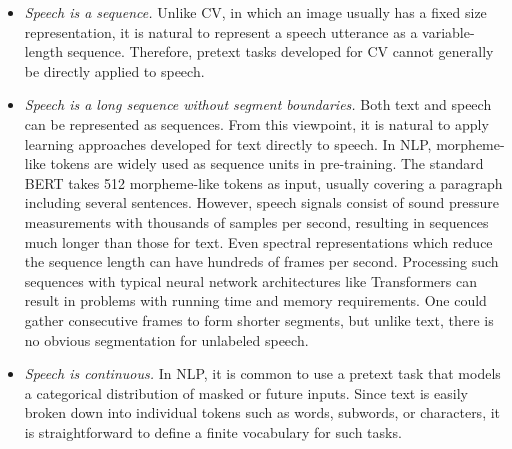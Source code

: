 \begin{itemize}
\item \textit{Speech is a sequence.} 
Unlike CV, in which an image usually has a fixed size representation, it is
natural to represent a speech utterance as a variable-length sequence. 
Therefore, pretext tasks developed for CV cannot generally be directly
applied to speech.

\item \textit{Speech is a long sequence without segment boundaries.} 
Both text and speech can be represented as sequences. From this viewpoint, it
is natural to apply learning approaches developed for text directly to
speech. 
In NLP, morpheme-like tokens are widely used as sequence units in
pre-training. The standard BERT takes 512 morpheme-like tokens as
input, usually covering a paragraph including several sentences. 
However, speech signals consist of sound pressure measurements with thousands
of samples per second, resulting in sequences much longer than those for text. Even
spectral representations which reduce the sequence length can have hundreds of
frames per second.
Processing such sequences with typical neural network architectures like
Transformers can result in problems with running time and memory requirements. 
One could gather consecutive frames to form shorter segments,
but unlike text, there is no obvious segmentation for unlabeled
speech.
\item \textit{Speech is continuous.} 
In NLP, it is common to use a pretext task that models a categorical
distribution of masked or future inputs. Since text is easily broken down into
individual tokens such as words, subwords, or characters, it is
straightforward to define a finite vocabulary for such tasks.

\end{itemize}
